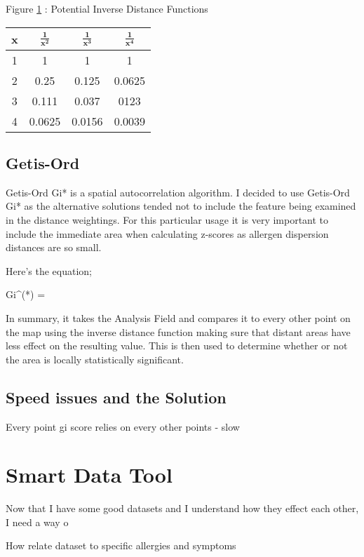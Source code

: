 \begin{table}
\begin{center}
Figure \ref{table:dist} : Potential Inverse Distance Functions\\\label{table:dist}
\begin{tabular}{|c|c|c|c|}\hline\hline
x&$\mathbf{\frac{1}{x^2}}$&$\mathbf{\frac{1}{x^3}}$&$\mathbf{\frac{1}{x^4}}$\\\hline
1&1&1&1\\
2&0.25&0.125&0.0625\\
3&0.111&0.037&0123\\
4&0.0625&0.0156&0.0039\\\hline\hline
\end{tabular}
\end{center}
\end{table}


\subsection{Getis-Ord}

Getis-Ord Gi* is a spatial autocorrelation algorithm. I decided to use Getis-Ord Gi* as the alternative solutions tended not to include the feature being examined in the distance weightings. For this particular usage it is very important to include the immediate area when calculating z-scores as allergen dispersion distances are so small.

Here's the equation;

\begin{myequation}%
Gi^(*) = 
\end{myequation}

In summary, it takes the Analysis Field and compares it to every other point on the map using the inverse distance function making sure that distant areas have less effect on the resulting value. This is then used to determine whether or not the area is locally statistically significant.

\subsection{Speed issues and the Solution}

Every point gi score relies on every other points - slow

\section{Smart Data Tool}

Now that I have some good datasets and I understand how they effect each other, I need a way o

How relate dataset to specific allergies and symptoms